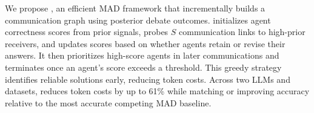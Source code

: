 We propose \sysname, an efficient MAD framework that incrementally builds a communication graph using posterior debate outcomes. \sysname initializes agent correctness scores from prior signals, probes $S$ communication links to high-prior receivers, and updates scores based on whether agents retain or revise their answers. It then prioritizes high-score agents in later communications and terminates once an agent’s score exceeds a threshold. This greedy strategy identifies reliable solutions early, reducing token costs. Across two LLMs and datasets, \sysname reduces token costs by up to 61\% while matching or improving accuracy relative to the most accurate competing MAD baseline.
